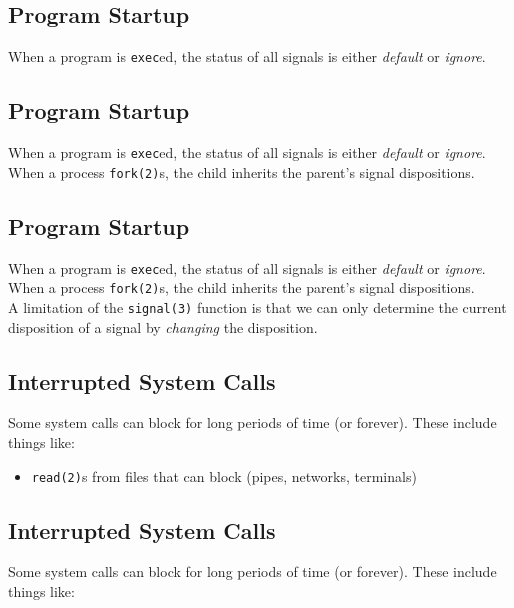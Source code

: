 \documentclass[xga]{xdvislides}
\begin{document}
\subsection{Program Startup}

When a program is {\tt exec}ed, the status of all signals is either {\em
default} or {\em ignore}.

\subsection{Program Startup}

When a program is {\tt exec}ed, the status of all signals is either {\em
default} or {\em ignore}.
\\

When a process {\tt fork(2)}s, the child inherits the parent's signal
dispositions.

\subsection{Program Startup}

When a program is {\tt exec}ed, the status of all signals is either {\em
default} or {\em ignore}.
\\

When a process {\tt fork(2)}s, the child inherits the parent's signal
dispositions.
\\

A limitation of the {\tt signal(3)} function is that we can only determine the
current disposition of a signal by {\em changing} the disposition.

\subsection{Interrupted System Calls}

Some system calls can block for long periods of time (or forever). These
include things like:

\begin{itemize}
	\item {\tt read(2)}s from files that can block (pipes, networks, terminals)
\end{itemize}

\subsection{Interrupted System Calls}

Some system calls can block for long periods of time (or forever). These
include things like:
\end{document}
